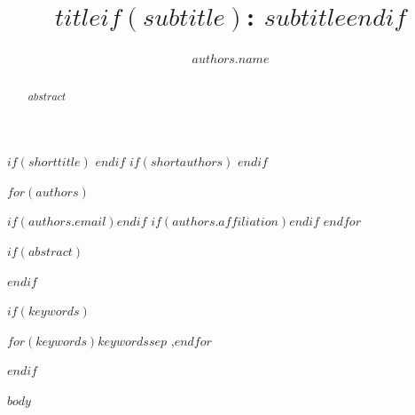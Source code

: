 \documentclass[a4paper,fleqn]{cas-dc}
\begin{document}
$if(shorttitle)$
$endif$
$if(shortauthors)$
$endif$

\title[mode=title]{$title$$if(subtitle)$: $subtitle$$endif$}

$for(authors)$
\author{$authors.name$}
$if(authors.email)$$endif$
$if(authors.affiliation)$$endif$
$endfor$

$if(abstract)$
\begin{abstract}
$abstract$
\end{abstract}
$endif$

$if(keywords)$
\begin{keywords}
$for(keywords)$$keywords$$sep$ \sep $endfor$
\end{keywords}
$endif$

\maketitle

$body$


\end{document}
